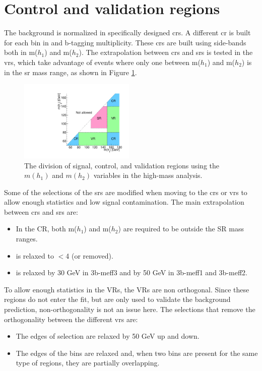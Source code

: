 \section{Control and validation regions}

The \ttbar background is normalized in specifically designed \glspl{cr}.
A different \gls{cr} is built for each bin in \meffb and b-tagging multiplicity. 
These \glspl{cr} are built using side-bands both in m($h_1$) and m($h_2$). 
The extrapolation between \glspl{cr} and \glspl{sr} is tested in the \glspl{vr}, which take advantage of events
where only one between m($h_1$) and m($h_2$) is in the \gls{sr} mass range, 
as shown in Figure \ref{fig:binning_crvr}.

\begin{figure}[htbp]
	\centering
	\includegraphics[width=0.490\textwidth]{figures/ewk_prod/varie/schema-1}
	\caption{The division of signal, control, and validation regions using the $m(h_1)$ and $m(h_2)$ variables in the high-mass analysis.}
	\label{fig:binning_crvr}
\end{figure}

Some of the selections of the \glspl{sr} are modified when moving to the \glspl{cr} or \glspl{vr}
 to allow enough statistics and low signal contamination.
The main extrapolation between \glspl{cr} and \glspl{sr} are:

\begin{itemize}
\item In the CR, both m($h_1$) and m($h_2$) are required to be outside the SR mass ranges.
\item \dRmax is relaxed to $<$4 (or removed).
\item \mtb is relaxed by 30 GeV in 3b-meff3 and by 50 GeV in 3b-meff1 and 3b-meff2.
\end{itemize}

To allow enough statistics in the VRs, the VRs are non orthogonal. Since these regions do not enter the fit, but are only used to validate the background prediction, non-orthogonality is not an issue here. 
The selections that remove the orthogonality between the different \glspl{vr} are:
\begin{itemize}
\item The edges of \meffb selection are relaxed by 50 GeV up and down.
\item The edges of the \dRmax bins are relaxed and, when two \dRmax bins are present for the same type of regions, they are partially overlapping.
\end{itemize}

